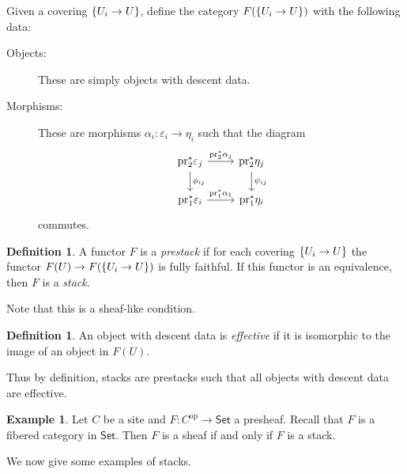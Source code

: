 \documentclass[leqno, openany]{memoir}
\theoremstyle{definition}
\newtheorem{defn}[thm]{Definition}
\newtheorem{exm}[thm]{Example}
\theoremstyle{remark}
\theoremstyle{plain}
\theoremstyle{definition}
\theoremstyle{remark}
\newcommand{\ep}{\varepsilon}
\newcommand{\mr}[1]{\mathrm{#1}}
\newcommand{\ms}[1]{\mathsf{#1}}
\begin{document}
Given a covering $\qty{U_i \to U}$, define the category $F(\qty{U_i \to U})$
with the following data: \begin{description} \item[Objects:] These are simply
    objects with descent data.  \item[Morphisms:] These are morphisms $\alpha_i
    \colon \ep_i \to \eta_i$ such that the diagram \begin{equation*}
        \begin{tikzcd} \mr{pr}_2^* \ep_j \arrow{d}{\phi_{ij}}
            \arrow{r}{\mr{pr}_2^* \alpha_j} & \mr{pr}_2^* \eta_j
            \arrow{d}{\psi_{ij}} \\ \mr{pr}_1^* \ep_i \arrow{r}{\mr{pr}_1^*
        \alpha_1} & \mr{pr}_1^* \eta_i \end{tikzcd} \end{equation*} commutes.
\end{description}

\begin{defn} A functor $F$ is a \textit{prestack} if for each covering
$\qty{U_i \to U}$ the functor $F(U) \to F(\qty{U_i \to U})$ is fully faithful.
If this functor is an equivalence, then $F$ is a \textit{stack}.  \end{defn}

Note that this is a sheaf-like condition.

\begin{defn} An object with descent data is \textit{effective} if it is
isomorphic to the image of an object in $F(U)$.  \end{defn}

Thus by definition, stacks are prestacks such that all objects with descent
data are effective.

\begin{exm} Let $C$ be a site and $F \colon C^{\mr{op}} \to \ms{Set}$ a
presheaf. Recall that $F$ is a fibered category in $\ms{Set}$. Then $F$ is a
sheaf if and only if $F$ is a stack.  \end{exm}

We now give some examples of stacks.
\end{document}

